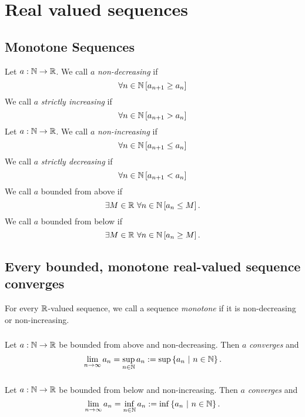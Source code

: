 \section{Real valued sequences}



\subsection{Monotone Sequences}
\udef Let $a : \mathbb{N} \to \mathbb{R}$. We call $a$ \emph{non-decreasing} if
\[
    \forall n \in \mathbb{N} \left[ a_{n+1} \geq a_n \right]
\]
\udef We call $a$ \emph{strictly increasing} if
\[
    \forall n \in \mathbb{N} \left[ a_{n+1} > a_n \right]
\]
\udef Let $a : \mathbb{N} \to \mathbb{R}$. We call $a$ \emph{non-increasing} if
\[
    \forall n \in \mathbb{N} \left[ a_{n+1} \leq a_n \right]
\]
\udef We call $a$ \emph{strictly decreasing} if
\[
    \forall n \in \mathbb{N} \left[ a_{n+1} < a_n \right]
\]
\udef We call $a$ bounded from above if
\[
    \exists M \in \R\ \forall n \in \N \left[ a_n \leq M \right].
\]
\udef We call $a$ bounded from below if
\[
    \exists M \in \R\ \forall n \in \N \left[ a_n \geq M \right].
\]


\subsection{Every bounded, monotone real-valued sequence converges}
\udef For every $\mathbb{R}$-valued sequence, we call a sequence \emph{monotone} if
it is non-decreasing or non-increasing.

\subsubsection*{}
\uthm Let $a : \mathbb{N} \to \mathbb{R}$ be bounded from above and non-decreasing. Then $a$
\emph{converges} and
\[
    \lim_{n \to \infty} a_n = \sup_{n \in \mathbb{N}} a_n
        := \sup \left\{ a_n\ \middle|\ n \in \mathbb{N} \right\}.
\]

\subsubsection*{}
\uthm Let $a : \mathbb{N} \to \mathbb{R}$ be bounded from below and non-increasing. Then $a$
\emph{converges} and 
\[
    \lim_{n \to \infty} a_n = \inf_{n \in \mathbb{N}} a_n
        := \inf \left\{ a_n\ \middle|\ n \in \mathbb{N} \right\}.
\]


